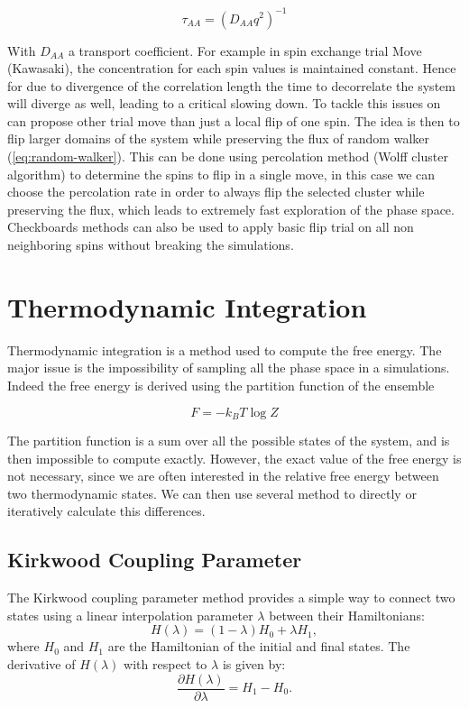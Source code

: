 \documentclass[ansiapaper]{report}
\begin{document}
\begin{multicols}{3}
$$\tau_{AA} = (D_{AA}q^2)^{-1}$$

With $D_{AA}$ a transport coefficient. For example in spin exchange trial Move (Kawasaki), the concentration for each spin values is maintained constant. Hence for due to divergence of the correlation length the time to decorrelate the system will diverge as well, leading to a critical slowing down. To tackle this issues on can propose other trial move than just a local flip of one spin. The idea is then to flip larger domains of the system while preserving the flux of random walker (\ref{eq:random-walker}). This can be done using percolation method (Wolff cluster algorithm) to determine the spins to flip in a single move, in this case we can choose the percolation rate in order to always flip the selected cluster while preserving the flux, which leads to extremely fast exploration of the phase space. Checkboards methods can also be used to apply basic flip trial on all non neighboring spins without breaking the simulations. 


\section{Thermodynamic Integration}

Thermodynamic integration is a method used to compute the free energy. The major issue is the impossibility of sampling all the phase space in a simulations. Indeed the free energy is derived using the partition function of the ensemble 

 $$ F = -k_BT\log{Z}$$

The partition function is a sum over all the possible states of the system, and is then impossible to compute exactly. However, the exact value of the free energy is not necessary, since we are often interested in the relative free energy between two thermodynamic states. We can then use several method to directly or iteratively calculate this differences.

\subsection{Kirkwood Coupling Parameter}
The Kirkwood coupling parameter method provides a simple way to connect two states using a linear interpolation parameter \( \lambda \) between their Hamiltonians:
\[
H(\lambda) = (1 - \lambda) H_0 + \lambda H_1,
\]
where \( H_0 \) and \( H_1 \) are the Hamiltonian of the initial and final states. The derivative of \( H(\lambda) \) with respect to \( \lambda \) is given by:
\[
\frac{\partial H(\lambda)}{\partial \lambda} = H_1 - H_0.
\]


\end{multicols}
\end{document}

